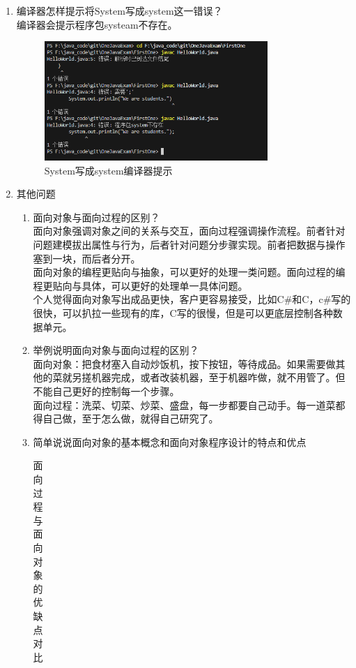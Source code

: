 \documentclass[12pt,a4paper]{article}
\begin{document}
\begin{enumerate}
\begin{enumerate}
        \item 编译器怎样提示将System写成system这一错误？\\
        编译器会提示程序包systeam不存在。
        \begin{figure}[H]
        \centering
        \includegraphics[width=0.8\textwidth]{question3.png}
        \caption{System写成system编译器提示}
        \end{figure}
        \item 其他问题
        \begin{enumerate}
            \item 面向对象与面向过程的区别？\\
            面向对象强调对象之间的关系与交互，面向过程强调操作流程。前者针对问题建模拔出属性与行为，后者针对问题分步骤实现。前者把数据与操作塞到一块，而后者分开。\\
            面向对象的编程更贴向与抽象，可以更好的处理一类问题。面向过程的编程更贴向与具体，可以更好的处理单一具体问题。\\
            个人觉得面向对象写出成品更快，客户更容易接受，比如C\#和C，c\#写的很快，可以扒拉一些现有的库，C写的很慢，但是可以更底层控制各种数据单元。
            \item 举例说明面向对象与面向过程的区别？\\
            面向对象：把食材塞入自动炒饭机，按下按钮，等待成品。如果需要做其他的菜就另搓机器完成，或者改装机器，至于机器咋做，就不用管了。但不能自己更好的控制每一个步骤。\\
            面向过程：洗菜、切菜、炒菜、盛盘，每一步都要自己动手。每一道菜都得自己做，至于怎么做，就得自己研究了。\\
            \item 简单说说面向对象的基本概念和面向对象程序设计的特点和优点\\
                \begin{table}[H]
                \centering
                \caption{面向过程与面向对象的优缺点对比}
                \begin{tabular}{|p{3cm}|p{6cm}|p{6cm}|}

\end{tabular}
\end{table}
\end{enumerate}
\end{enumerate}
\end{enumerate}
\end{document}
